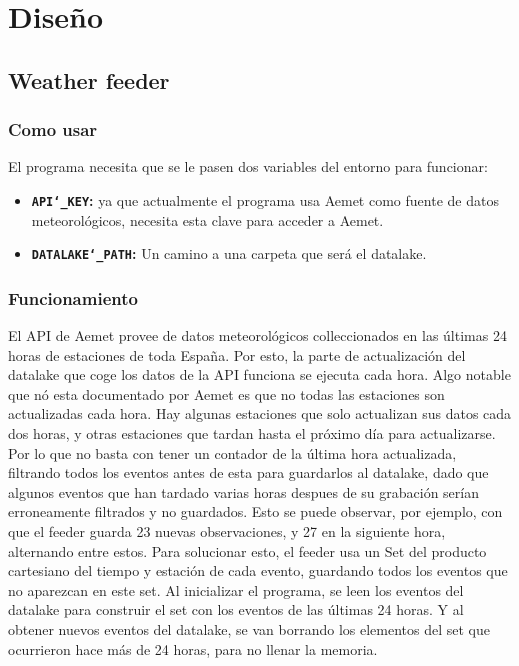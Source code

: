 \documentclass{article}
\begin{document}
\section{Diseño}

\subsection{Weather feeder}

\subsubsection{Como usar}

El programa necesita que se le pasen dos variables del entorno para funcionar:
\begin{itemize}
	\item \textbf{\texttt{API\char`_KEY}:} ya que actualmente el programa usa Aemet como fuente de datos meteorológicos, necesita esta clave para acceder a Aemet.
	\item \textbf{\texttt{DATALAKE\char`_PATH}:} Un camino a una carpeta que será el datalake.
\end{itemize}

\subsubsection{Funcionamiento}

El API de Aemet provee de datos meteorológicos colleccionados en las últimas 24 horas de estaciones de toda España.
Por esto, la parte de actualización del datalake que coge los datos de la API funciona se ejecuta cada hora.
Algo notable que nó esta documentado por Aemet es que no todas las estaciones son actualizadas cada hora.
Hay algunas estaciones que solo actualizan sus datos cada dos horas, y otras estaciones que tardan hasta el próximo día para actualizarse.
Por lo que no basta con tener un contador de la última hora actualizada, filtrando todos los eventos antes de esta para guardarlos al datalake,
dado que algunos eventos que han tardado varias horas despues de su grabación serían erroneamente filtrados y no guardados.
Esto se puede observar, por ejemplo, con que el feeder guarda 23 nuevas observaciones, y 27 en la siguiente hora, alternando entre estos.
Para solucionar esto, el feeder usa un Set del producto cartesiano del tiempo y estación de cada evento, guardando todos los eventos que no aparezcan en este set.
Al inicializar el programa, se leen los eventos del datalake para construir el set con los eventos de las últimas 24 horas.
Y al obtener nuevos eventos del datalake, se van borrando los elementos del set que ocurrieron hace más de 24 horas, para no llenar la memoria.
\end{document}
